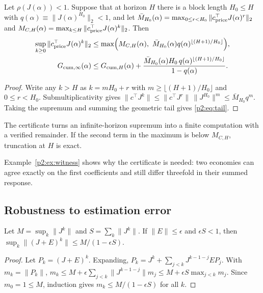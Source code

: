 \begin{lemma}\label{p2:lem:tail}
Let $\rho(J(\alpha))<1$. Suppose that at horizon $H$ there is a block length $H_0\le H$ with $q(\alpha)\equiv\|J(\alpha)^{H_0}\|_2<1$, and let $\bar M_{H_0}(\alpha)=\max_{0\le r<H_0}\|c^\top_{\rm price}J(\alpha)^r\|_2$ and $M_{C,H}(\alpha)=\max_{k\le H}\|c^\top_{\rm price}J(\alpha)^k\|_2$. Then
\begin{align}
\sup_{k\ge0}\|c^\top_{\rm price}J(\alpha)^k\|_2&\le\max\Bigl(M_{C,H}(\alpha),\ \bar M_{H_0}(\alpha)q(\alpha)^{\lfloor(H+1)/H_0\rfloor}\Bigr),\label{p2:eq:tail}\\
G_{{\rm cum},\infty}(\alpha)&\le G_{{\rm cum},H}(\alpha)+\frac{\bar M_{H_0}(\alpha)H_0\,q(\alpha)^{\lfloor(H+1)/H_0\rfloor}}{1-q(\alpha)}.\notag
\end{align}
\end{lemma}

\begin{proof}
Write any $k>H$ as $k=mH_0+r$ with $m\ge\lfloor(H+1)/H_0\rfloor$ and $0\le r<H_0$. Submultiplicativity gives $\|c^\top J^k\|\le\|c^\top J^r\|\,\|J^{H_0}\|^m\le\bar M_{H_0}q^m$. Taking the supremum and summing the geometric tail gives \eqref{p2:eq:tail}.
\end{proof}

The certificate turns an infinite-horizon supremum into a finite computation with a verified remainder. If the second term in the maximum is below $M_{C,H}$, truncation at $H$ is exact.

Example~\ref{p2:ex:witness} shows why the certificate is needed: two economies can agree exactly on the first coefficients and still differ threefold in their summed response.

\subsection{Robustness to estimation error}

\begin{theorem}\label{p2:thm:robust}
Let $M=\sup_k\|J^k\|$ and $S=\sum_k\|J^k\|$. If $\|E\|\le\epsilon$ and $\epsilon S<1$, then $\sup_k\|(J+E)^k\|\le M/(1-\epsilon S)$.
\end{theorem}

\begin{proof}
Let $P_k=(J+E)^k$. Expanding, $P_k=J^k+\sum_{j<k}J^{k-1-j}EP_j$. With $m_k=\|P_k\|$, $m_k\le M+\epsilon\sum_{j<k}\|J^{k-1-j}\|m_j\le M+\epsilon S\max_{j<k}m_j$. Since $m_0=1\le M$, induction gives $m_k\le M/(1-\epsilon S)$ for all $k$.
\end{proof}


